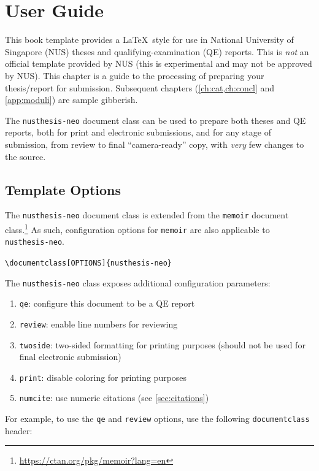 \chapter{User Guide}\label{ch:user-guide}

This book template provides a \LaTeX\ style for use in National 
University of Singapore (NUS) theses
and qualifying-examination (QE) reports. This is \emph{not}
an official template provided by NUS (this is experimental and
may not be approved by NUS). This chapter is a guide to
the processing of preparing your thesis/report for submission.
Subsequent chapters (\cref{ch:cat,ch:concl} and \cref{app:moduli})
are sample gibberish.

The \texttt{nusthesis-neo} document class can be used to prepare
both theses and QE reports, both for print and electronic submissions,
and for any stage of submission, from review to final ``camera-ready''
copy, with \emph{very} few changes to the source.

\section{Template Options}\label{sec:template-options}

The \texttt{nusthesis-neo} document class is extended from the \texttt{memoir}
document class.\footnote{\url{https://ctan.org/pkg/memoir?lang=en}} 
As such, configuration options for \texttt{memoir} are also applicable to
\texttt{nusthesis-neo}.

\texttt{\textbackslash documentclass[OPTIONS]\{nusthesis-neo\}}

The \texttt{nusthesis-neo} class exposes additional configuration parameters:
\begin{enumerate}
    \item \texttt{qe}: configure this document to be a QE report
    \item \texttt{review}: enable line numbers for reviewing
    \item \texttt{twoside}: two-sided formatting for printing purposes
    (should not be used for final electronic submission)
    \item \texttt{print}: disable coloring for printing purposes
    \item \texttt{numcite}: use numeric citations (see \cref{sec:citations})
\end{enumerate}

For example, to use the \texttt{qe} and \texttt{review} options, use the
following \texttt{documentclass} header:

